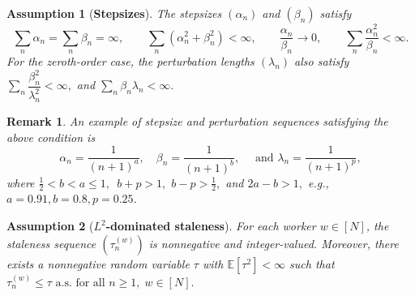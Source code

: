 \documentclass{article}
\newtheorem{remark}[theorem]{Remark}
\newtheorem{assumption}{Assumption}
\begin{document}
\begin{assumption}[\textbf{Stepsizes}]
\label{Step-sizeA}
The stepsizes $(\alpha_n)$ and $(\beta_n)$ satisfy
\[
    \sum_n\alpha_n=\sum_n\beta_n=\infty,\qquad
    \sum_n(\alpha_n^2+\beta_n^2)<\infty,\qquad
    \frac{\alpha_n}{\beta_n}\to0,\qquad
    \sum_n\frac{\alpha_n^2}{\beta_n}<\infty .
\]
For the zeroth-order case, the perturbation lengths $(\lambda_n)$ also 
satisfy $\sum\limits_n\dfrac{\beta_n^2}{\lambda_n^2}<\infty,$ and $\sum\limits_n\beta_n\lambda_n<\infty.$
\end{assumption}

\begin{remark}
An example of stepsize and perturbation  sequences satisfying the above condition is
%
\[
    \alpha_n = \frac{1}{(n + 1)^a}, \quad \beta_n = \frac{1}{(n + 1)^b}, \quad  \text{ and } \lambda_n  = \frac{1}{(n + 1)^p},
\]
%
where $\frac{1}{2}< b < a \leq 1,$\  $b + p > 1,$ $b - p > \frac{1}{2},$ and $2a - b > 1,$ e.g., $a = 0.91, b = 0.8, p = 0.25.$
%
\end{remark}


\begin{assumption}[\textbf{$L^2$-dominated staleness}]
\label{ass:delay}
For each worker $w\in[N]$, the staleness sequence $(\tau_n^{(w)})$ is
nonnegative and integer-valued. Moreover, there exists a nonnegative random
variable $\tau$ with $\mathbb E[\tau^2]<\infty$ such that $\tau_n^{(w)}\le \tau  \text{ a.s. for all } n\ge1,\; w\in[N].$
\end{assumption}




\end{document}
